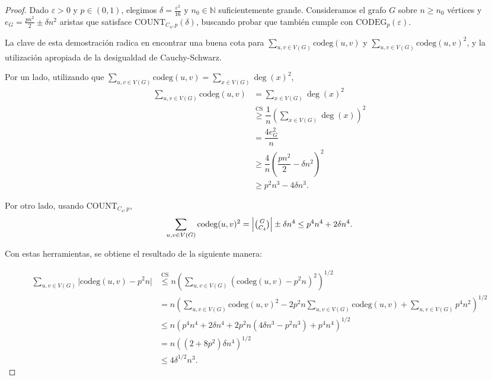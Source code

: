\documentclass{article}[14pts]
\newcommand{\Count}{\mathrm{COUNT}}
\newcommand{\codeg}{\mathrm{CODEG}}
\newcommand{\cod}{\mathrm{codeg}}
\let\varepsilon=\varepsilon
\begin{document}
\begin{proof}
    Dado $\varepsilon > 0$ y $p\in (0,1)$, elegimos $\delta = \frac{\varepsilon^{2}}{16}$ y $n_0\in\mathbb{N}$ suficientemente grande. Consideramos el grafo $G$ sobre $n\geq n_0$ vértices y $e_G = \frac{pn^{2}}{2} \pm \delta n^{2}$ aristas que satisface $\Count_{C_4,p}(\delta)$, buscando probar que también cumple con $\codeg_p(\varepsilon)$.

    La clave de esta demostración radica en encontrar una buena cota para $\sum_{u,v\in V(G)} \cod(u,v)$ y $\sum_{u,v\in V(G)} \cod(u,v)^{2}$, y la utilización apropiada de la desigualdad de Cauchy-Schwarz.
    
    Por un lado, utilizando que $\sum_{u,v\in V(G)} \cod(u,v) = \sum_{x\in V(G)} \deg(x)^{2}$,
    \begin{align*}
        \displaystyle\sum_{u,v\in V(G)} \cod(u,v) &= \displaystyle\sum_{x\in V(G)} \deg(x)^{2}\\
        &\overset{\mathrm{CS}}{\geq} \dfrac{1}{n}\left( \displaystyle\sum_{x\in V(G)} \deg(x)\right)^{2}\\
        &= \dfrac{4e_G^{2}}{n}\\
        &\geq \dfrac{4}{n}\left( \dfrac{pn^{2}}{2} - \delta n^{2}\right)^{2}\\
        &\geq p^{2}n^{3} - 4\delta n^{3}.
    \end{align*}

    Por otro lado, usando $\Count_{C_4,p}$, 
     \begin{equation*}
         \displaystyle\sum_{u,v\in V(G)} \cod(u,v)^{2} = \left|\tbinom{G}{C_4}\right| \pm \delta n^{4} \leq p^{4}n^{4} + 2\delta n^{4}.
     \end{equation*}

     Con estas herramientas, se obtiene el resultado de la siguiente manera:

     \begin{align*}
         \displaystyle\sum_{u,v\in V(G)} \Big|\cod(u,v) - p^{2}n\Big| &\overset{\mathrm{CS}}{\leq} n\left(\displaystyle\sum_{u,v\in V(G)} (\cod(u,v) - p^{2}n)^{2} \right)^{1/2}\\
         &= n\left(\displaystyle\sum_{u,v\in V(G)} \cod(u,v)^{2} - 2p^{2}n\displaystyle\sum_{u,v\in V(G)} \cod(u,v) + \displaystyle\sum_{u,v\in V(G)} p^{4}n^{2} \right)^{1/2}\\
         &\leq n\left(p^{4}n^{4} + 2\delta n^{4} + 2p^{2}n(4\delta n^{3} - p^{2}n^{3}) + p^{4}n^{4} \right)^{1/2}\\
         &= n((2 + 8p^{2})\delta n^{4})^{1/2}\\
         &\leq 4\delta^{1/2}n^{3}.
     \end{align*}
\end{proof}\medskip
\end{document}
